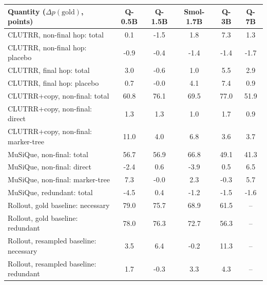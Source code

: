 \begin{tabular}{lccccc}
\toprule
Quantity ($\Delta p(\text{gold})$, points) & Q-0.5B & Q-1.5B & Smol-1.7B & Q-3B & Q-7B \\
\midrule
CLUTRR, non-final hop: total & 0.1 & -1.5 & 1.8 & 7.3 & 1.3 \\
CLUTRR, non-final hop: placebo & -0.9 & -0.4 & -1.4 & -1.4 & -1.7 \\
CLUTRR, final hop: total & 3.0 & -0.6 & 1.0 & 5.5 & 2.9 \\
CLUTRR, final hop: placebo & 0.7 & -0.0 & 4.1 & 7.4 & 0.9 \\
\midrule
CLUTRR+copy, non-final: total & 60.8 & 76.1 & 69.5 & 77.0 & 51.9 \\
CLUTRR+copy, non-final: direct & 1.3 & 1.3 & 1.0 & 1.7 & 0.9 \\
CLUTRR+copy, non-final: marker-tree & 11.0 & 4.0 & 6.8 & 3.6 & 3.7 \\
\midrule
MuSiQue, non-final: total & 56.7 & 56.9 & 66.8 & 49.1 & 41.3 \\
MuSiQue, non-final: direct & -2.4 & 0.6 & -3.9 & 0.5 & 6.5 \\
MuSiQue, non-final: marker-tree & 7.3 & -0.0 & 2.3 & -0.3 & 5.7 \\
MuSiQue, redundant: total & -4.5 & 0.4 & -1.2 & -1.5 & -1.6 \\
\midrule
Rollout, gold baseline: necessary & 79.0 & 75.7 & 68.9 & 61.5 & -- \\
Rollout, gold baseline: redundant & 78.0 & 76.3 & 72.7 & 56.3 & -- \\
Rollout, resampled baseline: necessary & 3.5 & 6.4 & -0.2 & 11.3 & -- \\
Rollout, resampled baseline: redundant & 1.7 & -0.3 & 3.3 & 4.3 & -- \\
\bottomrule
\end{tabular}
